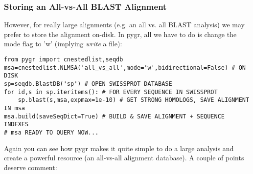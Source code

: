 \documentclass{howto}
\begin{document}
\subsubsection{Storing an All-vs-All BLAST Alignment}
However, for really large
alignments (e.g. an all vs. all BLAST analysis) we may prefer to store the alignment
on-disk.  In pygr, all we have to do is change the mode flag to 'w' (implying {\em write}
a file):
\begin{verbatim}
from pygr import cnestedlist,seqdb
msa=cnestedlist.NLMSA('all_vs_all',mode='w',bidirectional=False) # ON-DISK
sp=seqdb.BlastDB('sp') # OPEN SWISSPROT DATABASE
for id,s in sp.iteritems(): # FOR EVERY SEQUENCE IN SWISSPROT
    sp.blast(s,msa,expmax=1e-10) # GET STRONG HOMOLOGS, SAVE ALIGNMENT IN msa
msa.build(saveSeqDict=True) # BUILD & SAVE ALIGNMENT + SEQUENCE INDEXES
# msa READY TO QUERY NOW...
\end{verbatim}
Again you can see how pygr makes it quite simple to do a large analysis
and create a powerful resource (an all-vs-all alignment database).
A couple of points deserve comment:
\end{document}
